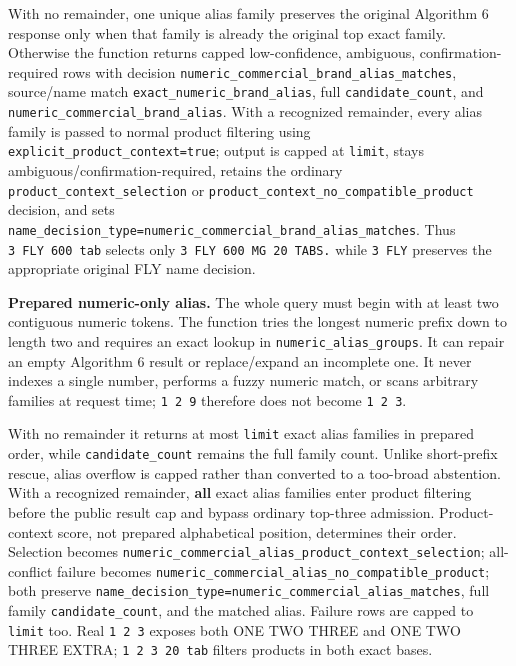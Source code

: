 With no remainder, one unique alias family preserves the original Algorithm 6 response only when that family is already the original top exact family. Otherwise the function returns capped low-confidence, ambiguous, confirmation-required rows with decision \texttt{numeric\_\allowbreak{}commercial\_\allowbreak{}brand\_\allowbreak{}alias\_\allowbreak{}matches}, source/name match \texttt{exact\_\allowbreak{}numeric\_\allowbreak{}brand\_\allowbreak{}alias}, full \texttt{candidate\_\allowbreak{}count}, and \texttt{numeric\_\allowbreak{}commercial\_\allowbreak{}brand\_\allowbreak{}alias}. With a recognized remainder, every alias family is passed to normal product filtering using \texttt{explicit\_\allowbreak{}product\_\allowbreak{}context=true}; output is capped at \texttt{limit}, stays ambiguous/confirmation-required, retains the ordinary \texttt{product\_\allowbreak{}context\_\allowbreak{}selection} or \texttt{product\_\allowbreak{}context\_\allowbreak{}no\_\allowbreak{}compatible\_\allowbreak{}product} decision, and sets \texttt{name\_\allowbreak{}decision\_\allowbreak{}type=numeric\_\allowbreak{}commercial\_\allowbreak{}brand\_\allowbreak{}alias\_\allowbreak{}matches}. Thus \texttt{3\ FLY\ 600\ tab} selects only \texttt{3\ FLY\ 600\ MG\ 20\ TABS.} while \texttt{3\ FLY} preserves the appropriate original FLY name decision.

\textbf{Prepared numeric-only alias.} The whole query must begin with at least two contiguous numeric tokens. The function tries the longest numeric prefix down to length two and requires an exact lookup in \texttt{numeric\_\allowbreak{}alias\_\allowbreak{}groups}. It can repair an empty Algorithm 6 result or replace/expand an incomplete one. It never indexes a single number, performs a fuzzy numeric match, or scans arbitrary families at request time; \texttt{1\ 2\ 9} therefore does not become \texttt{1\ 2\ 3}.

With no remainder it returns at most \texttt{limit} exact alias families in prepared order, while \texttt{candidate\_\allowbreak{}count} remains the full family count. Unlike short-prefix rescue, alias overflow is capped rather than converted to a too-broad abstention. With a recognized remainder, \textbf{all} exact alias families enter product filtering before the public result cap and bypass ordinary top-three admission. Product-context score, not prepared alphabetical position, determines their order. Selection becomes \texttt{numeric\_\allowbreak{}commercial\_\allowbreak{}alias\_\allowbreak{}product\_\allowbreak{}context\_\allowbreak{}selection}; all-conflict failure becomes \texttt{numeric\_\allowbreak{}commercial\_\allowbreak{}alias\_\allowbreak{}no\_\allowbreak{}compatible\_\allowbreak{}product}; both preserve \texttt{name\_\allowbreak{}decision\_\allowbreak{}type=numeric\_\allowbreak{}commercial\_\allowbreak{}alias\_\allowbreak{}matches}, full family \texttt{candidate\_\allowbreak{}count}, and the matched alias. Failure rows are capped to \texttt{limit} too. Real \texttt{1\ 2\ 3} exposes both ONE TWO THREE and ONE TWO THREE EXTRA; \texttt{1\ 2\ 3\ 20\ tab} filters products in both exact bases.

